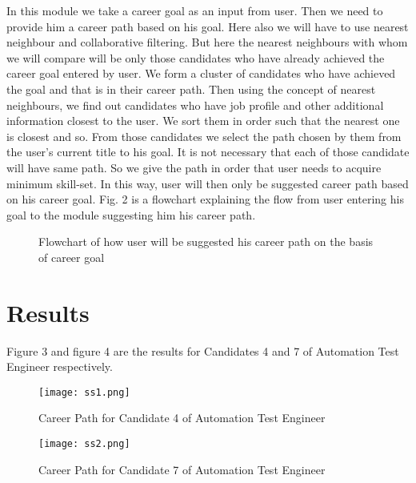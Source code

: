 \documentclass[conference]{IEEEtran}
\begin{document}
In this module we take a career goal as an input from user. Then we need to provide him a career path based on his goal. Here also we will have to use nearest neighbour and collaborative filtering. But here the nearest neighbours with whom we will compare will be only those candidates who have already achieved the career goal entered by user. We form a cluster of candidates who have achieved the goal and that is in their career path. Then using the concept of nearest neighbours, we find out candidates who have job profile and other additional information closest to the user. We sort them in order such that the nearest one is closest and so. From those candidates we select the path chosen by them from the user's current title to his goal. It is not necessary that each of those candidate will have same path. So we give the path in order that user needs to acquire minimum skill-set. In this way, user will then only be suggested career path based on his career goal. Fig. 2 is a flowchart explaining the flow from user entering his goal to the module suggesting him his career path.
\begin{figure}[!htb]
    \centering
    \caption{Flowchart of how user will be suggested his career path on the basis of career goal}
    \label{fig:datafusionindirectdirectfc}
  \end{figure}


\section{Results}
Figure 3 and figure 4 are the results for Candidates 4 and 7 of Automation Test Engineer respectively.
\begin{figure}

  \texttt{[image: ss1.png]}
  \caption{Career Path for Candidate 4 of Automation Test Engineer}
    
  \texttt{[image: ss2.png]}
  \caption{Career Path for Candidate 7 of Automation Test Engineer}

\end{figure}
\end{document}
